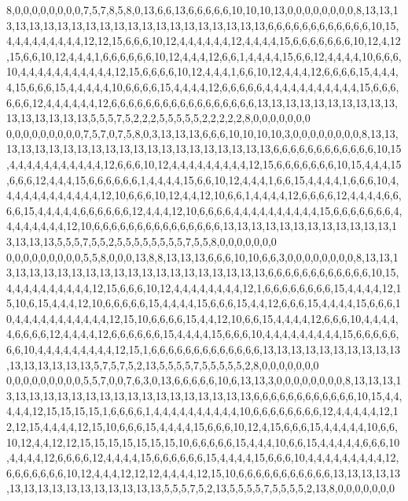 8,0,0,0,0,0,0,0,0,7,5,7,8,5,8,0,13,6,6,13,6,6,6,6,6,10,10,10,13,0,0,0,0,0,0,0,0,8,13,13,13,13,13,13,13,13,13,13,13,13,13,13,13,13,13,13,13,13,13,6,6,6,6,6,6,6,6,6,6,6,6,10,15,4,4,4,4,4,4,4,4,4,12,12,15,6,6,6,10,12,4,4,4,4,4,4,12,4,4,4,4,15,6,6,6,6,6,6,6,10,12,4,12,15,6,6,10,12,4,4,4,1,6,6,6,6,6,6,10,12,4,4,4,12,6,6,1,4,4,4,4,15,6,6,12,4,4,4,4,10,6,6,6,10,4,4,4,4,4,4,4,4,4,4,4,12,15,6,6,6,6,10,12,4,4,4,1,6,6,10,12,4,4,4,12,6,6,6,6,15,4,4,4,4,15,6,6,6,15,4,4,4,4,4,10,6,6,6,6,15,4,4,4,4,12,6,6,6,6,6,4,4,4,4,4,4,4,4,4,4,4,15,6,6,6,6,6,6,12,4,4,4,4,4,4,12,6,6,6,6,6,6,6,6,6,6,6,6,6,6,6,6,6,13,13,13,13,13,13,13,13,13,13,13,13,13,13,13,13,5,5,5,7,5,2,2,2,5,5,5,5,5,2,2,2,2,2,8,0,0,0,0,0,0,0
0,0,0,0,0,0,0,0,0,7,5,7,0,7,5,8,0,3,13,13,13,6,6,6,10,10,10,10,3,0,0,0,0,0,0,0,0,8,13,13,13,13,13,13,13,13,13,13,13,13,13,13,13,13,13,13,13,13,13,6,6,6,6,6,6,6,6,6,6,6,6,10,15,4,4,4,4,4,4,4,4,4,4,4,12,6,6,6,10,12,4,4,4,4,4,4,4,4,4,12,15,6,6,6,6,6,6,6,10,15,4,4,4,15,6,6,6,12,4,4,4,15,6,6,6,6,6,6,1,4,4,4,4,15,6,6,10,12,4,4,4,1,6,6,15,4,4,4,4,1,6,6,6,10,4,4,4,4,4,4,4,4,4,4,4,4,12,10,6,6,6,10,12,4,4,12,10,6,6,1,4,4,4,4,12,6,6,6,6,12,4,4,4,4,6,6,6,6,15,4,4,4,4,4,6,6,6,6,6,6,12,4,4,4,12,10,6,6,6,6,4,4,4,4,4,4,4,4,4,4,15,6,6,6,6,6,6,6,4,4,4,4,4,4,4,4,12,10,6,6,6,6,6,6,6,6,6,6,6,6,6,6,6,13,13,13,13,13,13,13,13,13,13,13,13,13,13,13,13,5,5,5,7,5,5,2,5,5,5,5,5,5,5,5,7,5,5,8,0,0,0,0,0,0,0
0,0,0,0,0,0,0,0,0,5,5,8,0,0,0,13,8,8,13,13,13,6,6,6,10,10,6,6,3,0,0,0,0,0,0,0,0,8,13,13,13,13,13,13,13,13,13,13,13,13,13,13,13,13,13,13,13,13,13,6,6,6,6,6,6,6,6,6,6,6,6,10,15,4,4,4,4,4,4,4,4,4,4,12,15,6,6,6,10,12,4,4,4,4,4,4,4,4,12,1,6,6,6,6,6,6,6,6,15,4,4,4,4,12,15,10,6,15,4,4,4,12,10,6,6,6,6,6,15,4,4,4,4,15,6,6,6,15,4,4,12,6,6,6,15,4,4,4,4,15,6,6,6,10,4,4,4,4,4,4,4,4,4,4,4,12,15,10,6,6,6,6,15,4,4,12,10,6,6,15,4,4,4,4,12,6,6,6,10,4,4,4,4,4,6,6,6,6,12,4,4,4,4,12,6,6,6,6,6,6,15,4,4,4,4,15,6,6,6,10,4,4,4,4,4,4,4,4,4,15,6,6,6,6,6,6,6,10,4,4,4,4,4,4,4,4,4,12,15,1,6,6,6,6,6,6,6,6,6,6,6,6,6,13,13,13,13,13,13,13,13,13,13,13,13,13,13,13,13,5,7,5,7,5,2,13,5,5,5,5,7,5,5,5,5,5,2,8,0,0,0,0,0,0,0
0,0,0,0,0,0,0,0,0,5,5,7,0,0,7,6,3,0,13,6,6,6,6,6,10,6,13,13,3,0,0,0,0,0,0,0,0,8,13,13,13,13,13,13,13,13,13,13,13,13,13,13,13,13,13,13,13,13,13,6,6,6,6,6,6,6,6,6,6,6,6,10,15,4,4,4,4,4,12,15,15,15,15,1,6,6,6,6,1,4,4,4,4,4,4,4,4,4,4,10,6,6,6,6,6,6,6,6,12,4,4,4,4,4,12,12,12,15,4,4,4,4,12,15,10,6,6,6,15,4,4,4,4,15,6,6,6,10,12,4,15,6,6,6,15,4,4,4,4,4,10,6,6,10,12,4,4,12,12,15,15,15,15,15,15,15,10,6,6,6,6,6,15,4,4,4,10,6,6,15,4,4,4,4,4,6,6,6,10,4,4,4,4,12,6,6,6,6,12,4,4,4,4,15,6,6,6,6,6,6,15,4,4,4,4,15,6,6,6,10,4,4,4,4,4,4,4,4,4,12,6,6,6,6,6,6,6,10,12,4,4,4,12,12,12,4,4,4,4,12,15,10,6,6,6,6,6,6,6,6,6,6,6,13,13,13,13,13,13,13,13,13,13,13,13,13,13,13,13,5,5,5,7,5,2,13,5,5,5,5,7,5,5,5,5,2,13,8,0,0,0,0,0,0,0
